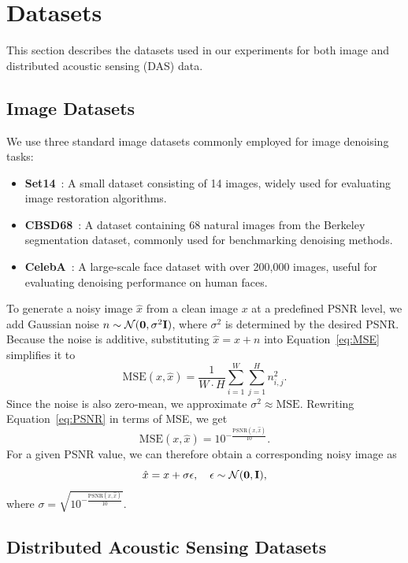 \section{Datasets}

This section describes the datasets used in our experiments for both image and distributed acoustic sensing (DAS) data.

\subsection{Image Datasets}

We use three standard image datasets commonly employed for image denoising tasks:
\begin{itemize}
    \item \textbf{Set14}~\cite{Set14}: A small dataset consisting of 14 images, widely used for evaluating image restoration algorithms.
    \item \textbf{CBSD68}~\cite{CBSD68}: A dataset containing 68 natural images from the Berkeley segmentation dataset, commonly used for benchmarking denoising methods.
    \item \textbf{CelebA}~\cite{CelebA}: A large-scale face dataset with over 200,000 images, useful for evaluating denoising performance on human faces.
\end{itemize}

To generate a noisy image $\hat{x}$ from a clean image $x$ at a predefined PSNR level, we add Gaussian noise $n \sim \normal$, where $\sigma^2$ is determined by the desired PSNR\@.
Because the noise is additive, substituting $\hat{x} = x + n$ into Equation~\ref{eq:MSE} simplifies it to
\begin{equation}
    \text{MSE}(x,\hat{x}) = \frac{1}{W \cdot H} \sum_{i=1}^{W} \sum_{j=1}^{H} n_{i,j}^2.
\end{equation}
Since the noise is also zero-mean, we approximate $\sigma^2 \approx \text{MSE}$.
Rewriting Equation~\ref{eq:PSNR} in terms of MSE, we get
\begin{equation}
    \text{MSE}(x,\hat{x}) = 10^{-\frac{\text{PSNR}(x,\hat{x})}{10}}.
\end{equation}
For a given PSNR value, we can therefore obtain a corresponding noisy image as
\begin{equation}
    \hat{x} = x + \sigma\epsilon, \quad \epsilon \sim \mathcal{N}(\mathbf{0},\mathbf{I}),
\end{equation}
where $\sigma = \sqrt{10^{-\frac{\text{PSNR}(x,\hat{x})}{10}}}$.

\subsection{Distributed Acoustic Sensing Datasets}

